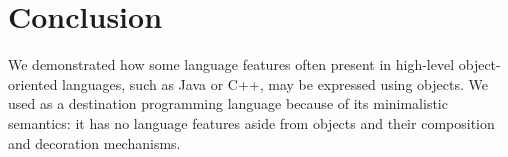 
\section{Conclusion}

We demonstrated how some language features often present in high-level
  object-oriented languages, such as Java or C++, may be expressed
  using objects.
We used \eolang{} as a destination programming language because of its
  minimalistic semantics: it has no language features aside from objects
  and their composition and decoration mechanisms.
